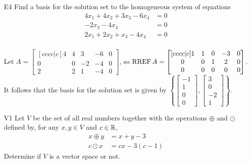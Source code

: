 \documentclass{sbgLAquiz}
\begin{document}
\begin{extract}\newpage\end{extract}
\begin{problem}{E4}
Find a basis for the solution set to the homogeneous system of equations
\begin{align*}
4x_1+4x_2+3x_3-6x_4 &= 0 \\
-2x_3-4x_4 &= 0 \\
2x_1+2x_2+x_3-4x_4 &= 0 \\
\end{align*}
\end{problem}
\begin{solution}
Let \(A =
  \begin{bmatrix}[cccc|c]
    4 & 4 & 3 & -6 & 0 \\
    0 & 0 & -2 & -4 & 0 \\
    2 & 2 & 1 & -4 & 0
  \end{bmatrix}
\), so \(\operatorname{RREF} A =
  \begin{bmatrix}[cccc|c]
    1 & 1 & 0 & -3 & 0 \\
    0 & 0 & 1 & 2 & 0 \\
    0 & 0 & 0 & 0 & 0
  \end{bmatrix}
\).
It follows that the basis for the solution set is given by \(\left\{
  \begin{bmatrix}
    -1 \\
    1 \\
    0 \\
    0
  \end{bmatrix},
  \begin{bmatrix}
    3 \\
    0 \\
    -2 \\
    1
  \end{bmatrix}
\right\}\).
\end{solution}

\begin{problem}{V1}
Let $V$ be the  set of all real numbers together with the operations $\oplus$ and $\odot$ defined by, for any $x,y \in V$ and $c \in \mathbb{R}$,
\begin{align*}
x\oplus y  &= x+y-3 \\
c \odot x &= cx-3(c-1)
\end{align*}
Determine if $V$ is a vector space or not.
\end{problem}
\end{document}
